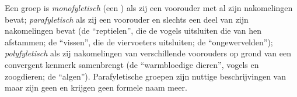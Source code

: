 \begin{definition}\label{def:b1:classifying-biodiversity:monophyly}
Een groep is \emph{monofyletisch} (een ) als zij een voorouder met al
zijn nakomelingen bevat; \emph{parafyletisch} als zij een voorouder en slechts
een deel van zijn nakomelingen bevat (de ``reptielen'', die de vogels
uitsluiten die van hen afstammen; de ``vissen'', die de viervoeters
uitsluiten; de ``ongewervelden''); \emph{polyfyletisch} als zij nakomelingen
van verschillende voorouders op grond van een convergent kenmerk samenbrengt
(de ``warmbloedige dieren'', vogels en zoogdieren; de ``algen'').
Parafyletische groepen zijn nuttige beschrijvingen van
 maar zijn geen  en krijgen geen formele naam meer.
\end{definition}

